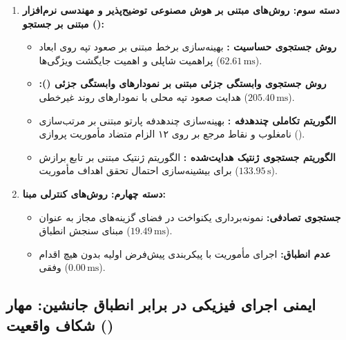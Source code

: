 \documentclass[oneside,openany,phd]{TMU-Thesis}
\begin{document}
\begin{enumerate}
\begin{itemize}
        \item \textbf{روش پایه  \cite{mnih2015human}:} یادگیری تقویتی استاندارد تفاضل زمانی بدون شکل‌دهی پاداش ($\rho = 0.0$) بر روی سوابق بازپخش با غلبه شدید داده‌های شکست ($90.98\%$).
    \end{itemize}
    \item \textbf{دسته سوم: روش‌های مبتنی بر هوش مصنوعی توضیح‌پذیر و مهندسی نرم‌افزار مبتنی بر جستجو ():}
    \begin{itemize}
        \item \textbf{روش جستجوی حساسیت  \cite{negri2026efficient}:} بهینه‌سازی برخط مبتنی بر صعود تپه روی ابعاد پراهمیت شاپلی و اهمیت جایگشت ویژگی‌ها ($62.61\,\text{ms}$).
        \item \textbf{روش جستجوی وابستگی جزئی  مبتنی بر نمودارهای وابستگی جزئی ():} هدایت صعود تپه محلی با نمودارهای روند غیرخطی ($205.40\,\text{ms}$).
        \item \textbf{الگوریتم تکاملی چندهدفه  \cite{deb2013evolutionary}:} بهینه‌سازی چندهدفه پارتو مبتنی بر مرتب‌سازی نامغلوب و نقاط مرجع بر روی ۱۲ الزام متضاد مأموریت پروازی ().
        \item \textbf{الگوریتم جستجوی ژنتیک هدایت‌شده  \cite{abdessalem2018testing}:} الگوریتم ژنتیک مبتنی بر تابع برازش برای بیشینه‌سازی احتمال تحقق اهداف مأموریت ($133.95\,\text{s}$).
    \end{itemize}
    \item \textbf{دسته چهارم: روش‌های کنترلی مبنا:}
    \begin{itemize}
        \item \textbf{جستجوی تصادفی:} نمونه‌برداری یکنواخت در فضای گزینه‌های مجاز به عنوان مبنای سنجش انطباق ($19.49\,\text{ms}$).
        \item \textbf{عدم انطباق:} اجرای مأموریت با پیکربندی پیش‌فرض اولیه بدون هیچ اقدام وفقی ($0.00\,\text{ms}$).
    \end{itemize}
\end{enumerate}

\subsection{ایمنی اجرای فیزیکی در برابر انطباق جانشین: مهار شکاف واقعیت ()}
\label{subsec:dartsim_reality_gap}
\end{document}
